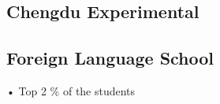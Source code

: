 \documentclass[]{deedy-resume-reversed}
\begin{document}
\begin{minipage}[t]{0.32\textwidth}
\subsection{Chengdu Experimental}
\subsection{Foreign Language School}

• Top 2 \% of the students




\end{minipage}
\end{document}
